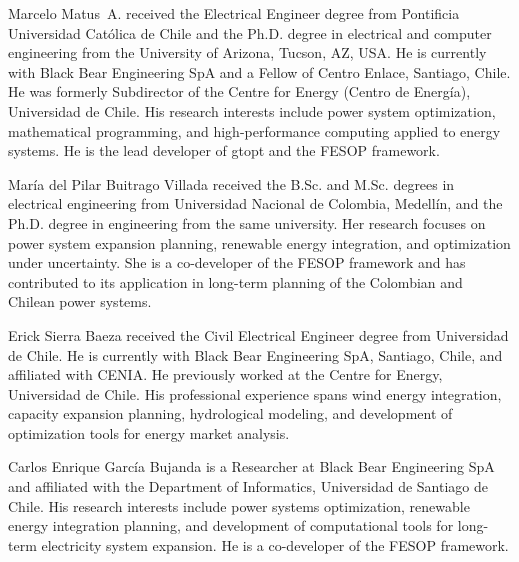 \begin{IEEEbiography}{Marcelo Matus~A.}
  received the Electrical Engineer degree from Pontificia Universidad
  Cat\'olica de Chile and the Ph.D. degree in electrical and computer
  engineering from the University of Arizona, Tucson, AZ, USA.  He is
  currently with Black Bear Engineering SpA and a Fellow of Centro
  Enlace, Santiago, Chile.  He was formerly Subdirector of the Centre for Energy (Centro
  de Energ\'ia), Universidad de Chile.  His research interests include
  power system optimization, mathematical programming, and
  high-performance computing applied to energy systems.  He is the
  lead developer of gtopt and the FESOP framework.
\end{IEEEbiography}

\begin{IEEEbiography}{Mar\'ia del Pilar Buitrago Villada}
  received the B.Sc. and M.Sc. degrees in electrical engineering from
  Universidad Nacional de Colombia, Medell\'in, and the Ph.D. degree in
  engineering from the same university.  Her research focuses on power
  system expansion planning, renewable energy integration, and
  optimization under uncertainty.  She is a co-developer of the FESOP
  framework and has contributed to its application in long-term planning
  of the Colombian and Chilean power systems.
\end{IEEEbiography}

\begin{IEEEbiography}{Erick Sierra Baeza}
  received the Civil Electrical Engineer degree from Universidad de Chile.
  He is currently with Black Bear Engineering SpA, Santiago, Chile, and
  affiliated with CENIA.  He previously worked at the Centre for Energy,
  Universidad de Chile.  His professional experience spans wind energy
  integration, capacity expansion planning, hydrological modeling, and
  development of optimization tools for energy market analysis.
\end{IEEEbiography}

\begin{IEEEbiography}{Carlos Enrique Garc\'ia Bujanda}
  is a Researcher at Black Bear Engineering SpA and affiliated with the
  Department of Informatics, Universidad de Santiago de Chile.  His
  research interests include power systems optimization, renewable energy
  integration planning, and development of computational tools for
  long-term electricity system expansion.  He is a co-developer of the
  FESOP framework.
\end{IEEEbiography}

